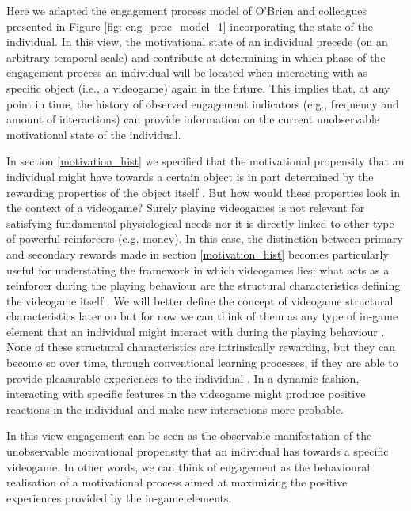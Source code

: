 

Here we adapted the engagement process model of O'Brien and colleagues \cite{o2008user} presented in Figure \ref{fig: eng_proc_model_1} incorporating the state of the individual. In this view, the motivational state of an individual precede (on an arbitrary temporal scale) and contribute at determining in which phase of the engagement process an individual will be located when interacting with as specific object (i.e., a videogame) again in the future. This implies that, at any point in time, the history of observed engagement indicators (e.g., frequency and amount of interactions) can provide information on the current unobservable motivational state of the individual. 

In section \ref{motivation_hist} we specified that the motivational propensity that an individual might have towards a certain object is in part determined by the rewarding properties of the object itself \cite{berridge2004motivation}. But how would these properties look in the context of a videogame? Surely playing videogames is not relevant for satisfying fundamental physiological needs nor it is directly linked to other type of powerful reinforcers (e.g. money). In this case, the distinction between primary and secondary rewards made in section \ref{motivation_hist} becomes particularly useful for understating the framework in which videogames lies: what acts as a reinforcer during the playing behaviour are the structural characteristics defining the videogame itself \cite{king2010role, king2010video, yannakakis2013player}. We will better define the concept of videogame structural characteristics later on but for now we can think of them as any type of in-game element that an individual might interact with during the playing behaviour \cite{king2010role,king2010video}. None of these structural characteristics are intrinsically rewarding, but they can become so over time, through conventional learning processes, if they are able to provide pleasurable experiences to the individual \cite{skinner1953science, berridge2004motivation, przybylski2010motivational}. In a dynamic fashion, interacting with specific features in the videogame might produce positive reactions in the individual and make new interactions more probable. 

In this view engagement can be seen as the observable manifestation of the unobservable motivational propensity that an individual has towards a specific videogame. In other words, we can think of engagement as the behavioural realisation of a motivational process aimed at maximizing the positive experiences provided by the in-game elements. 

